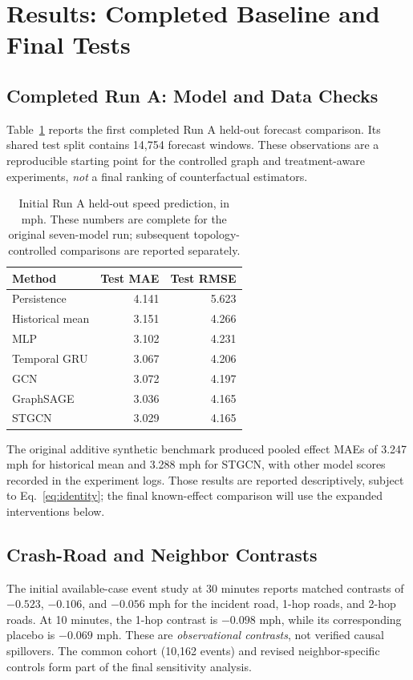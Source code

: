 \documentclass[sigconf,nonacm]{acmart}
\begin{document}
\section{Results: Completed Baseline and Final Tests}
\subsection{Completed Run A: Model and Data Checks}
Table~\ref{tab:forecast} reports the first completed Run A held-out
forecast comparison. Its shared test split contains 14,754 forecast
windows. These observations are a reproducible starting point for the
controlled graph and treatment-aware experiments, \emph{not} a final
ranking of counterfactual estimators.

\begin{table}[t]
\centering
\caption{Initial Run A held-out speed prediction, in mph. These
numbers are complete for the original seven-model run; subsequent
topology-controlled comparisons are reported separately.}
\label{tab:forecast}
\footnotesize
\begin{tabular}{lrr}
\toprule
Method & Test MAE & Test RMSE \\
\midrule
Persistence & 4.141 & 5.623 \\
Historical mean & 3.151 & 4.266 \\
MLP & 3.102 & 4.231 \\
Temporal GRU & 3.067 & 4.206 \\
GCN & 3.072 & 4.197 \\
GraphSAGE & 3.036 & 4.165 \\
STGCN & 3.029 & 4.165 \\
\bottomrule
\end{tabular}
\end{table}

The original additive synthetic benchmark produced pooled effect MAEs
of 3.247 mph for historical mean and 3.288 mph for STGCN, with other
model scores recorded in the experiment logs. Those results are
reported descriptively, subject to Eq.~\ref{eq:identity}; the final
known-effect comparison will use the expanded interventions below.

\subsection{Crash-Road and Neighbor Contrasts}
The initial available-case event study at 30 minutes reports
matched contrasts of $-0.523$, $-0.106$, and $-0.056$ mph for the
incident road, 1-hop roads, and 2-hop roads. At 10 minutes, the 1-hop
contrast is $-0.098$ mph, while its corresponding placebo is
$-0.069$ mph. These are \emph{observational contrasts}, not verified
causal spillovers. The common cohort (10,162 events) and revised
neighbor-specific controls form part of the final sensitivity analysis.
\end{document}
